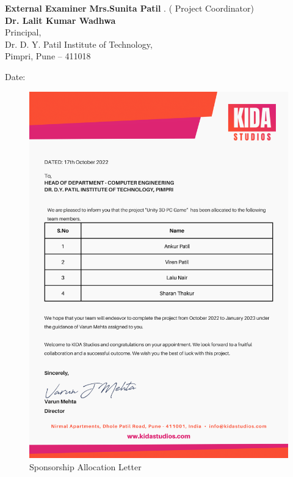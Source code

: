 \documentclass[12pt]{report}
\begin{document}
\vspace{0.7 cm}
\setlength{\parindent}{0 em}
\textbf{  External Examiner}   \hspace{7cm}      \textbf    {Mrs.Sunita Patil }   \hspace{5.5cm}         
\centering
.   \hspace{10cm}  ( Project Coordinator)  \hspace{2 cm}    \\
\vspace{0.4cm}
\centering
\textbf{Dr. Lalit Kumar Wadhwa}\\
 Principal,\\
 Dr. D. Y. Patil Institute of Technology,\\
 Pimpri, Pune – 411018
\vspace{0.1 cm}
\begin{flushleft}

Date:
\end{flushleft}


\clearpage




\begin{figure}[h]
\centering
\includegraphics[scale=0.65]{Allocation.png}
\caption{Sponsorship Allocation Letter}
\label{Sponsorship Letter}
\end{figure}
\end{document}
